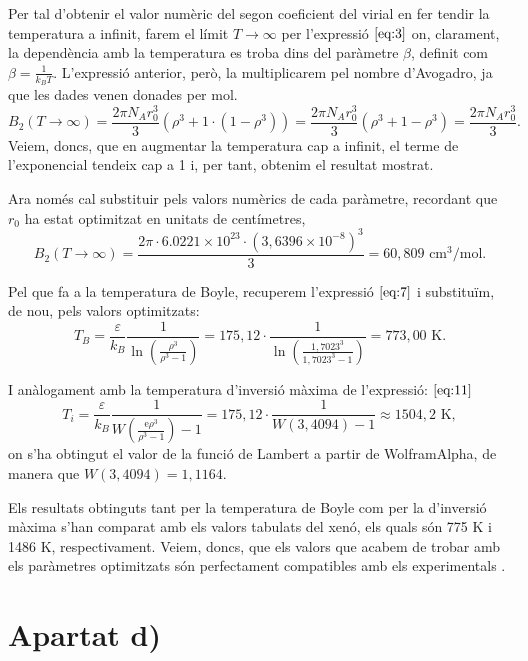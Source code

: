 \documentclass[a4paper, 10pt]{article}
\begin{document}
Per tal d'obtenir el valor numèric del segon coeficient del virial en fer tendir la temperatura a infinit, farem el límit $T \rightarrow \infty$ per l'expressió $\eqref{eq:3}$ on, clarament, la dependència amb la temperatura es troba dins del paràmetre $\beta$, definit com $\beta=\frac{1}{k_BT}$. L'expressió anterior, però, la multiplicarem pel nombre d'Avogadro, ja que les dades venen donades per mol.
\begin{equation*}
B_2(T \rightarrow \infty) = \frac{2\pi N_A r_0^3}{3} \left( \rho^3 + 1 \cdot (1 - \rho^3) \right) = \frac{2\pi N_A r_0^3}{3} \left( \rho^3 + 1 - \rho^3 \right) = \frac{2\pi N_A r_0^3}{3}.
\end{equation*}
Veiem, doncs, que en augmentar la temperatura cap a infinit, el terme de l'exponencial tendeix cap a 1 i, per tant, obtenim el resultat mostrat.

Ara només cal substituir pels valors numèrics de cada paràmetre, recordant que $r_0$ ha estat optimitzat en unitats de centímetres,
\begin{equation*}
	B_2(T \rightarrow \infty) = \frac{2\pi \cdot 6.0221 \times 10^{23} \cdot \left(3,6396 \times 10^{-8}\right)^3}{3}=\boxed{60,809 \text{ cm$^3$/mol}}.
\end{equation*}

Pel que fa a la temperatura de Boyle, recuperem l'expressió $\eqref{eq:7}$ i substituïm, de nou, pels valors optimitzats:
\begin{equation}
	T_B = \frac{\varepsilon}{k_B}\frac{1}{\ln\left(\frac{\rho^3}{\rho^3-1}\right)}=175,12\cdot \frac{1}{\ln(\frac{1,7023^3}{1,7023^3-1})}= \boxed{773,00 \text{ K}}.
\end{equation}

I anàlogament amb la temperatura d'inversió màxima de l'expressió: $\eqref{eq:11}$
\begin{equation}
	T_i=\frac{\varepsilon}{k_B}\frac{1}{W\left(\frac{\mathrm{e}\rho^3}{\rho^3-1}\right)-1}=175,12\cdot\frac{1}{W(3,4094)-1}\approx\boxed{1504,2 \text{ K}},
\end{equation}
on s'ha obtingut el valor de la funció de Lambert a partir de WolframAlpha, de manera que $W(3,4094) = 1,1164$.

Els resultats obtinguts tant per la temperatura de Boyle com per la d'inversió màxima s'han comparat amb els valors tabulats del xenó, els quals són 775 K i 1486 K, respectivament. Veiem, doncs, que els valors que acabem de trobar amb els paràmetres optimitzats són perfectament compatibles amb els experimentals
.
\newpage
\section*{\textbf{Apartat d)}}
\end{document}
